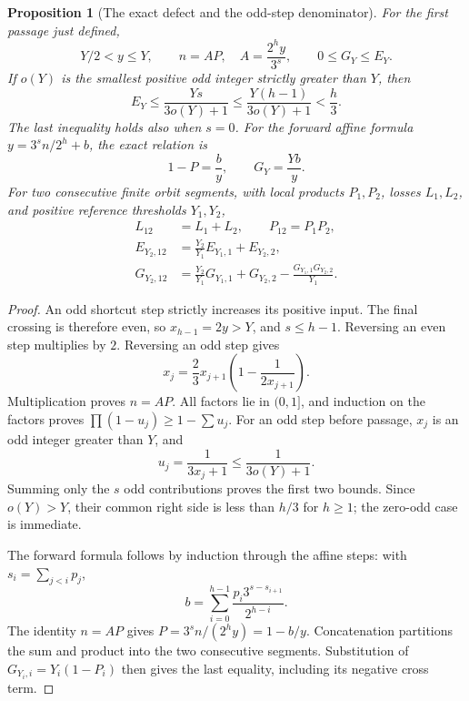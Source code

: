 \documentclass[11pt]{article}
\newtheorem{proposition}{Proposition}
\theoremstyle{remark}\newtheorem{remark}[proposition]{Remark}
\begin{document}
\begin{proposition}[The exact defect and the odd-step denominator]
\label{prop:shaik-defect}
For the first passage just defined,
\begin{equation}\label{eq:shaik-reverse-exact}
 Y/2<y\le Y,\qquad
 n=A P,\quad A=\frac{2^h y}{3^s},\qquad
 0\le G_Y\le E_Y.
\end{equation}
If \(o(Y)\) is the smallest positive odd integer strictly greater than
\(Y\), then
\begin{equation}\label{eq:shaik-local-loss}
 E_Y\le\frac{Ys}{3o(Y)+1}
 \le\frac{Y(h-1)}{3o(Y)+1}<\frac h3.
\end{equation}
The last inequality holds also when \(s=0\).
For the forward affine formula \(y=3^s n/2^h+b\), the exact relation is
\begin{equation}\label{eq:shaik-affine-defect}
 1-P=\frac by,\qquad G_Y=\frac{Yb}{y}.
\end{equation}
For two consecutive finite orbit segments, with local products \(P_1,P_2\),
losses \(L_1,L_2\), and positive reference thresholds \(Y_1,Y_2\),
\begin{align}
 L_{12}&=L_1+L_2,\qquad P_{12}=P_1P_2,\label{eq:shaik-concat}\\
 E_{Y_2,12}&=\frac{Y_2}{Y_1}E_{Y_1,1}+E_{Y_2,2},\nonumber\\
 G_{Y_2,12}&=\frac{Y_2}{Y_1}G_{Y_1,1}+G_{Y_2,2}
                  -\frac{G_{Y_1,1}G_{Y_2,2}}{Y_1}.\nonumber
\end{align}
\end{proposition}
\begin{proof}
An odd shortcut step strictly increases its positive input. The final
crossing is therefore even, so \(x_{h-1}=2y>Y\), and \(s\le h-1\).
Reversing an even step multiplies by \(2\). Reversing an odd step gives
\[
 x_j=\frac23 x_{j+1}\left(1-\frac1{2x_{j+1}}\right).
\]
Multiplication proves \(n=AP\). All factors lie in \((0,1]\), and induction
on the factors proves \(\prod(1-u_j)\ge1-\sum u_j\).
For an odd step before passage, \(x_j\) is an odd integer greater than
\(Y\), and
\[
 u_j=\frac1{3x_j+1}\le\frac1{3o(Y)+1}.
\]
Summing only the \(s\) odd contributions proves the first two bounds.
Since \(o(Y)>Y\), their common right side is less than \(h/3\) for
\(h\ge1\); the zero-odd case is immediate.

The forward formula follows by induction through the affine steps:
with \(s_i=\sum_{j<i}p_j\),
\[
 b=\sum_{i=0}^{h-1}\frac{p_i3^{s-s_{i+1}}}{2^{h-i}}.
\]
The identity \(n=AP\) gives \(P=3^sn/(2^hy)=1-b/y\).
Concatenation partitions the sum and product into the two consecutive
segments. Substitution of \(G_{Y_i,i}=Y_i(1-P_i)\) then gives the
last equality, including its negative cross term.
\end{proof}
\end{document}
